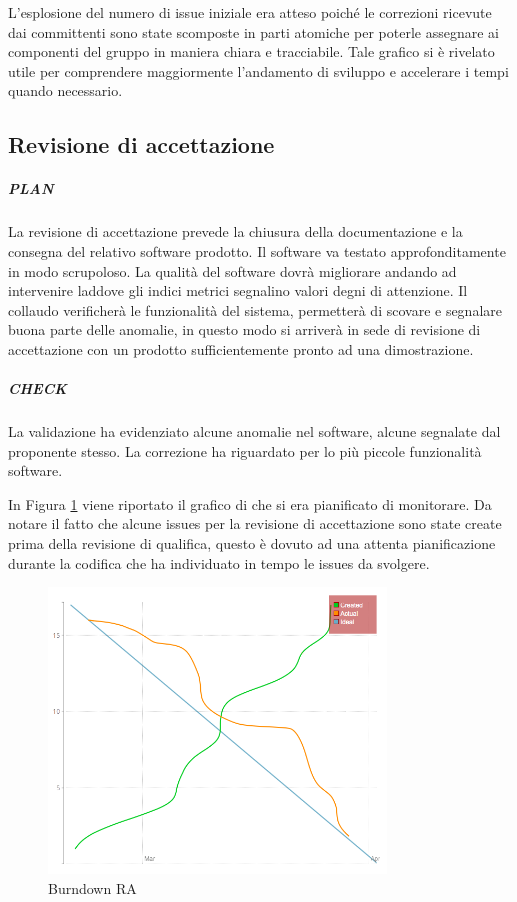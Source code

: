 	L'esplosione del numero di issue iniziale era atteso poiché le correzioni ricevute dai committenti sono state scomposte in parti atomiche per poterle assegnare ai componenti del gruppo in maniera chiara e tracciabile. Tale grafico si è rivelato utile per comprendere maggiormente l'andamento di sviluppo e accelerare i tempi quando necessario.




\subsection{Revisione di accettazione}
	\subparagraph{PLAN}
	La revisione di accettazione prevede la chiusura della documentazione e la consegna del relativo software prodotto. Il software va testato approfonditamente in modo scrupoloso. La qualità del software dovrà migliorare andando ad intervenire laddove gli indici metrici segnalino valori degni di attenzione. Il collaudo verificherà le funzionalità del sistema, permetterà di scovare e segnalare buona parte delle anomalie, in questo modo si arriverà in sede di revisione di accettazione con un prodotto sufficientemente pronto ad una dimostrazione.
	
	\subparagraph{CHECK}
	La validazione ha evidenziato alcune anomalie nel software, alcune segnalate dal proponente stesso. La correzione ha riguardato per lo più piccole funzionalità software. 
	

	In Figura \ref{fig:burndownRA} viene riportato il grafico di  che si era pianificato di monitorare. Da notare il fatto che alcune issues per la revisione di accettazione sono state create prima della revisione di qualifica, questo è dovuto ad una attenta pianificazione durante la codifica che ha individuato in tempo le issues da svolgere.  
	
	\begin{figure}[H]
		\centering \includegraphics[width=0.8\textwidth]{burndownRA.png}
		\caption{Burndown RA}
		\label{fig:burndownRA}
	\end{figure}
